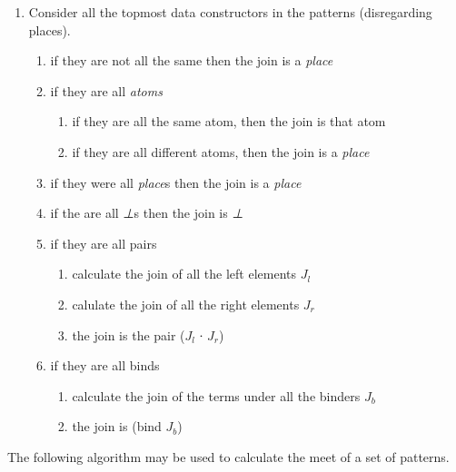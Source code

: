 \begin{appendices}
\begin{enumerate}
\item Consider all the topmost data constructors in the patterns
  (disregarding places).
  \begin{enumerate}
  \item if they are not all the same then the join is a \emph{place}
  \item if they are all \emph{atoms}
    \begin{enumerate}
    \item if they are all the same atom, then the join is that atom
      \item if they are all different atoms, then the join is a \emph{place}
    \end{enumerate}
  \item if they were all \emph{place}s then the join is a \emph{place}
  \item if the are all \emph{⊥}s then the join is \emph{⊥}  
  \item if they are all pairs
    \begin{enumerate}
      \item calculate the join of all the left elements $J_l$
      \item calulate the join of all the right elements $J_r$
      \item the join is the pair ($J_l$ ∙ $J_r$)
    \end{enumerate}
  \item if they are all binds
    \begin{enumerate}
    \item calculate the join of the terms under all the binders $J_b$
    \item the join is (bind $J_b$)
    \end{enumerate}
  \end{enumerate}
\end{enumerate}

The following algorithm may be used to calculate the meet of a set
of patterns.


\end{appendices}
